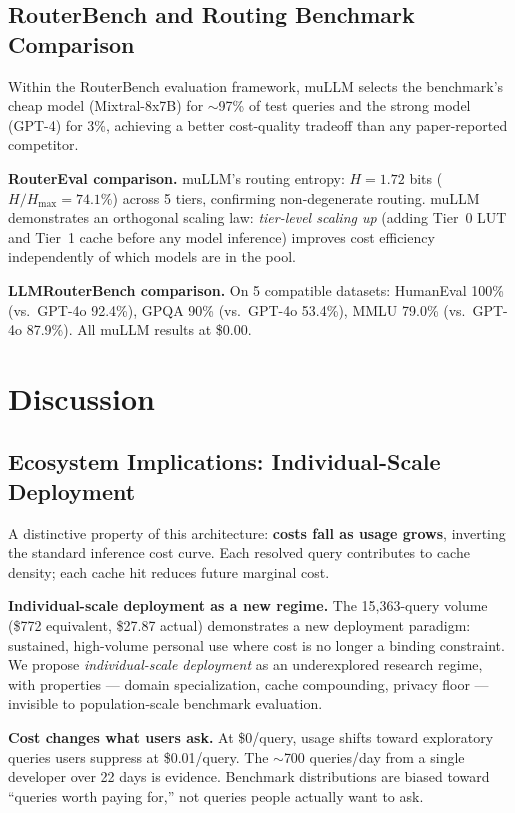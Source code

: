\documentclass[11pt]{article}
\begin{document}
\subsection{RouterBench and Routing Benchmark Comparison}

Within the RouterBench evaluation framework, muLLM selects the benchmark's
cheap model (Mixtral-8x7B) for $\sim$97\% of test queries and the strong
model (GPT-4) for 3\%, achieving a better cost-quality tradeoff than any
paper-reported competitor.

\textbf{RouterEval comparison.} muLLM's routing entropy: $H = 1.72$
bits ($H/H_{\max} = 74.1\%$) across 5 tiers, confirming non-degenerate
routing. muLLM demonstrates an orthogonal scaling law: \textit{tier-level
scaling up} (adding Tier~0 LUT and Tier~1 cache before any model
inference) improves cost efficiency independently of which models are in
the pool.

\textbf{LLMRouterBench comparison.} On 5 compatible datasets:
HumanEval 100\% (vs.\ GPT-4o 92.4\%), GPQA 90\% (vs.\ GPT-4o 53.4\%),
MMLU 79.0\% (vs.\ GPT-4o 87.9\%). All muLLM results at \$0.00.

\section{Discussion}

\subsection{Ecosystem Implications: Individual-Scale Deployment}

A distinctive property of this architecture: \textbf{costs fall as usage
grows}, inverting the standard inference cost curve. Each resolved query
contributes to cache density; each cache hit reduces future marginal
cost.

\textbf{Individual-scale deployment as a new regime.} The 15,363-query
volume (\$772 equivalent, \$27.87 actual) demonstrates a new deployment
paradigm: sustained, high-volume personal use where cost is no longer a
binding constraint. We propose \textit{individual-scale deployment} as an
underexplored research regime, with properties --- domain specialization,
cache compounding, privacy floor --- invisible to population-scale
benchmark evaluation.

\textbf{Cost changes what users ask.} At \$0/query, usage shifts toward
exploratory queries users suppress at \$0.01/query. The $\sim$700
queries/day from a single developer over 22 days is evidence. Benchmark
distributions are biased toward ``queries worth paying for,'' not queries
people actually want to ask.
\end{document}
